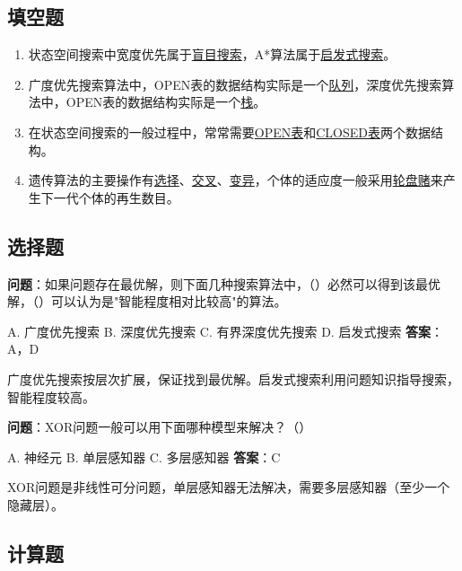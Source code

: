 \subsection{填空题}

\begin{enumerate}[leftmargin=2em,itemsep=2pt]
    \item 状态空间搜索中宽度优先属于\underline{盲目搜索}，A*算法属于\underline{启发式搜索}。
    \item 广度优先搜索算法中，OPEN表的数据结构实际是一个\underline{队列}，深度优先搜索算法中，OPEN表的数据结构实际是一个\underline{栈}。
    \item 在状态空间搜索的一般过程中，常常需要\underline{OPEN表}和\underline{CLOSED表}两个数据结构。
    \item 遗传算法的主要操作有\underline{选择}、\underline{交叉}、\underline{变异}，个体的适应度一般采用\underline{轮盘赌}来产生下一代个体的再生数目。
\end{enumerate}

\subsection{选择题}

\begin{examplebox}[选择题4.1]
\textbf{问题}：如果问题存在最优解，则下面几种搜索算法中，（\quad）必然可以得到该最优解，（\quad）可以认为是"智能程度相对比较高"的算法。

A. 广度优先搜索 \quad B. 深度优先搜索 \quad C. 有界深度优先搜索 \quad D. 启发式搜索
\tcblower
\textbf{答案}：A，D

广度优先搜索按层次扩展，保证找到最优解。启发式搜索利用问题知识指导搜索，智能程度较高。
\end{examplebox}

\begin{examplebox}[选择题4.2]
\textbf{问题}：XOR问题一般可以用下面哪种模型来解决？（\quad）

A. 神经元 \quad B. 单层感知器 \quad C. 多层感知器
\tcblower
\textbf{答案}：C

XOR问题是非线性可分问题，单层感知器无法解决，需要多层感知器（至少一个隐藏层）。
\end{examplebox}

\subsection{计算题}

